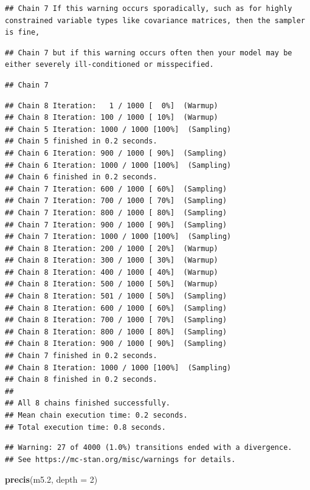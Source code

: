 \documentclass[
]{book}
\newenvironment{Shaded}{\begin{snugshade}}{\end{snugshade}}
\newcommand{\AttributeTok}[1]{\textcolor[rgb]{0.13,0.29,0.53}{#1}}
\newcommand{\DecValTok}[1]{\textcolor[rgb]{0.00,0.00,0.81}{#1}}
\newcommand{\FloatTok}[1]{\textcolor[rgb]{0.00,0.00,0.81}{#1}}
\newcommand{\FunctionTok}[1]{\textcolor[rgb]{0.13,0.29,0.53}{\textbf{#1}}}
\newcommand{\NormalTok}[1]{#1}
\begin{document}
\begin{verbatim}
## Chain 7 If this warning occurs sporadically, such as for highly constrained variable types like covariance matrices, then the sampler is fine,
\end{verbatim}

\begin{verbatim}
## Chain 7 but if this warning occurs often then your model may be either severely ill-conditioned or misspecified.
\end{verbatim}

\begin{verbatim}
## Chain 7
\end{verbatim}

\begin{verbatim}
## Chain 8 Iteration:   1 / 1000 [  0%]  (Warmup) 
## Chain 8 Iteration: 100 / 1000 [ 10%]  (Warmup) 
## Chain 5 Iteration: 1000 / 1000 [100%]  (Sampling) 
## Chain 5 finished in 0.2 seconds.
## Chain 6 Iteration: 900 / 1000 [ 90%]  (Sampling) 
## Chain 6 Iteration: 1000 / 1000 [100%]  (Sampling) 
## Chain 6 finished in 0.2 seconds.
## Chain 7 Iteration: 600 / 1000 [ 60%]  (Sampling) 
## Chain 7 Iteration: 700 / 1000 [ 70%]  (Sampling) 
## Chain 7 Iteration: 800 / 1000 [ 80%]  (Sampling) 
## Chain 7 Iteration: 900 / 1000 [ 90%]  (Sampling) 
## Chain 7 Iteration: 1000 / 1000 [100%]  (Sampling) 
## Chain 8 Iteration: 200 / 1000 [ 20%]  (Warmup) 
## Chain 8 Iteration: 300 / 1000 [ 30%]  (Warmup) 
## Chain 8 Iteration: 400 / 1000 [ 40%]  (Warmup) 
## Chain 8 Iteration: 500 / 1000 [ 50%]  (Warmup) 
## Chain 8 Iteration: 501 / 1000 [ 50%]  (Sampling) 
## Chain 8 Iteration: 600 / 1000 [ 60%]  (Sampling) 
## Chain 8 Iteration: 700 / 1000 [ 70%]  (Sampling) 
## Chain 8 Iteration: 800 / 1000 [ 80%]  (Sampling) 
## Chain 8 Iteration: 900 / 1000 [ 90%]  (Sampling) 
## Chain 7 finished in 0.2 seconds.
## Chain 8 Iteration: 1000 / 1000 [100%]  (Sampling) 
## Chain 8 finished in 0.2 seconds.
## 
## All 8 chains finished successfully.
## Mean chain execution time: 0.2 seconds.
## Total execution time: 0.8 seconds.
\end{verbatim}

\begin{verbatim}
## Warning: 27 of 4000 (1.0%) transitions ended with a divergence.
## See https://mc-stan.org/misc/warnings for details.
\end{verbatim}

\begin{Shaded}
\begin{Highlighting}[]
\FunctionTok{precis}\NormalTok{(m5}\FloatTok{.2}\NormalTok{, }\AttributeTok{depth =} \DecValTok{2}\NormalTok{)}
\end{Highlighting}
\end{Shaded}
\end{document}
